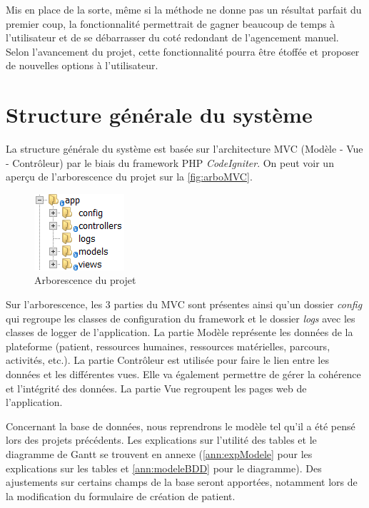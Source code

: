 \documentclass[noposter]{polytech/polytech}
\begin{document}
Mis en place de la sorte, même si la méthode ne donne pas un résultat parfait du premier coup, la fonctionnalité permettrait de gagner beaucoup de temps à l'utilisateur et de se débarrasser du coté redondant de l'agencement manuel. Selon l'avancement du projet, cette fonctionnalité pourra être étoffée et proposer de nouvelles options à l'utilisateur.


\section{Structure générale du système}
\label{sec:structure}

La structure générale du système est basée sur l'architecture MVC (Modèle - Vue - Contrôleur) par le biais du framework PHP \textit{CodeIgniter}. On peut voir un aperçu de l'arborescence du projet sur la \autoref{fig:arboMVC}. 

\begin{figure}
	\includegraphics[scale=1]{images/arboMVC}
	\caption{Arborescence du projet}
	\label{fig:arboMVC}
\end{figure}

Sur l'arborescence, les 3 parties du MVC sont présentes ainsi qu'un dossier \textit{config} qui regroupe les classes de configuration du framework et le dossier \textit{logs} avec les classes de logger de l'application. La partie Modèle représente les données de la plateforme (patient, ressources humaines, ressources matérielles, parcours, activités, etc.). La partie Contrôleur est utilisée pour faire le lien entre les données et les différentes vues. Elle va également permettre de gérer la cohérence et l'intégrité des données. La partie Vue regroupent les pages web de l'application. 

Concernant la base de données, nous reprendrons le modèle tel qu'il a été pensé lors des projets précédents. Les explications sur l'utilité des tables et le diagramme de Gantt se trouvent en annexe (\autoref{ann:expModele} pour les explications sur les tables et \autoref{ann:modeleBDD} pour le diagramme). Des ajustements sur certains champs de la base seront apportées, notamment lors de la modification du formulaire de création de patient. 
\end{document}
